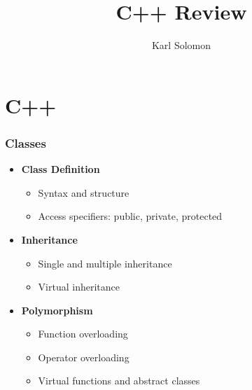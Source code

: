 \documentclass{article}
\begin{document}
\selectfont
\title{C++ Review}
\author{Karl Solomon}
\maketitle
\tableofcontents
\part{C++}
\section{Classes}
\begin{itemize}
	\item \textbf{Class Definition}
	      \begin{itemize}
		      \item Syntax and structure
		      \item Access specifiers: public, private, protected
	      \end{itemize}
	\item \textbf{Inheritance}
	      \begin{itemize}
		      \item Single and multiple inheritance
		      \item Virtual inheritance
	      \end{itemize}
	\item \textbf{Polymorphism}
	      \begin{itemize}
		      \item Function overloading
		      \item Operator overloading
		      \item Virtual functions and abstract classes
	      \end{itemize}
\end{itemize}
\end{document}
